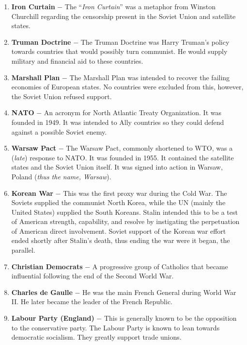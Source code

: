 \documentclass[12pt]{article}
\begin{document}
\begin{flushleft}
\begin{enumerate}
    \item \textbf{Iron Curtain} $-$ The ``\emph{Iron Curtain}''  was a metaphor from Winston Churchill regarding the censorship present in the Soviet Union and satellite states.

	\item \textbf{Truman Doctrine} $-$ The Truman Doctrine was Harry Truman's policy towards countries that would possibly turn communist. He would supply military and financial aid to these countries.

	\item \textbf{Marshall Plan} $-$ The Marshall Plan was intended to recover the failing economies of European states. No countries were excluded from this, however, the Soviet Union refused support.

	\item \textbf{NATO} $-$ An acronym for North Atlantic Treaty Organization. It was founded in 1949. It was intended to Ally countries so they could defend against a possible Soviet enemy.

    \item \textbf{Warsaw Pact} $-$ The Warsaw Pact, commonly shortened to WTO, was a (\emph{late}) response to NATO. It was founded in 1955. It contained the satellite states and the Soviet Union itself. It was signed into action in Warsaw, Poland (\emph{thus the name, Warsaw}).
    

    \item \textbf{Korean War} $-$ This was the first proxy war during the Cold War. The Soviets supplied the communist North Korea, while the UN (mainly the United States) supplied the South Koreans. Stalin intended this to be a test of American strength, capability, and resolve by instigating the perpetuation of American direct involvement. Soviet support of the Korean war effort ended shortly after Stalin's death, thus ending the war were it began, the  parallel.

	\item \textbf{Christian Democrats} $-$ A progressive group of Catholics that became influential following the end of the Second World War.

	\item \textbf{Charles de Gaulle} $-$ He was the main French General during World War II. He later became the leader of the French Republic.

	\item \textbf{Labour Party (England)} $-$ This is generally known to be the opposition to the conservative party. The Labour Party is known to lean towards democratic socialism. They greatly support trade unions.


\end{enumerate}
\end{flushleft}
\end{document}
